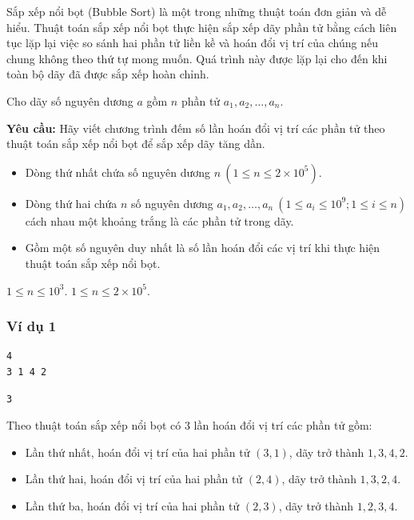 
Sắp xếp nổi bọt (Bubble Sort) là một trong những thuật toán đơn giản và dễ hiểu. Thuật toán sắp xếp nổi bọt thực hiện sắp xếp dãy phần tử bằng cách liên tục lặp lại việc so sánh hai phần tử liền kề và hoán đổi vị trí của chúng nếu chung không theo thứ tự mong muốn. Quá trình này được lặp lại cho đến khi toàn bộ dãy đã được sắp xếp hoàn chỉnh.

Cho dãy số nguyên dương $a$ gồm $n$ phần tử  $a_1, a_2, \dots, a_n$.

\medskip
\textbf{Yêu cầu:} Hãy viết chương trình đếm số lần hoán đổi vị trí các phần tử theo thuật toán sắp xếp nổi bọt để sắp xếp dãy tăng dần.

\begin{itemize}
    \item Dòng thứ nhất chứa số nguyên dương $n\ (1 \le n \le 2 \times 10^{5})$.
    \item Dòng thứ hai chứa $n$ số nguyên dương $a_1, a_2, \dots, a_n\ (1 \le a_i \le 10^{9}; 1 \le i \le n)$ cách nhau một khoảng trắng là các phần tử trong dãy.
\end{itemize}

\begin{itemize}
    \item Gồm một số nguyên duy nhất là số lần hoán đổi các vị trí khi thực hiện thuật toán sắp xếp nổi bọt.
\end{itemize}

\begin{makesubtasks}
     $1 \le n \le 10^{3}$.
     $1 \le n \le 2 \times 10^{5}$.
\end{makesubtasks}


\subsubsection*{Ví dụ 1}
\begin{makesample}
\begin{lstlisting}
4
3 1 4 2
\end{lstlisting}
\nextsample
\begin{lstlisting}
3
\end{lstlisting}
\end{makesample}

\begin{explain}
Theo thuật toán sắp xếp nổi bọt có $3$ lần hoán đổi vị trí các phần tử gồm:
\begin{itemize}
\item Lần thứ nhất, hoán đổi vị trí của hai phần tử $(3, 1)$, dãy trở thành $1,3,4,2$.
\item Lần thứ hai, hoán đổi vị trí của hai phần tử $(2, 4)$, dãy trở thành $1,3,2,4$.
\item Lần thứ ba, hoán đổi vị trí của hai phần tử $(2, 3)$, dãy trở thành $1,2,3,4$.
\end{itemize}
\end{explain}